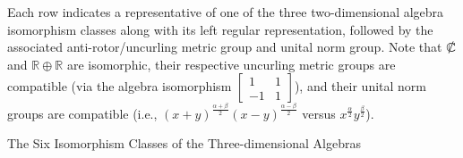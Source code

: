 \documentclass{amsart}
\numberwithin{equation}{section}
\theoremstyle{definition}
\numberwithin{theorem}{section}
\begin{document}
\vspace{.5cm}

 {\small Each row indicates a representative  of one of the three two-dimensional algebra isomorphism classes along with its left regular representation, followed by the associated anti-rotor/uncurling metric group and unital norm group. Note that  $\slashed{\mathbb{C}}$ and $\mathbb{R}\oplus\mathbb{R}$ are isomorphic, their respective uncurling metric groups are compatible (via the algebra isomorphism $\left[\begin{array}{ccc}
 1 & 1   \\ 
 -1 & 1    
\end{array}\right]$), and their unital norm groups are  compatible (i.e., $(x+y)^{\frac{\alpha+\beta}{2}}(x-y)^{\frac{\alpha-\beta}{2}}$ versus $x^\frac{\alpha}{2} y^\frac{\beta}{2}$).  }


\vfill
\hspace{0pt}
\pagebreak



 

\hspace{0pt}
\vfill


  \centerline{\Large The Six Isomorphism Classes of the Three-dimensional Algebras }

\vspace{.5cm}
\end{document}
